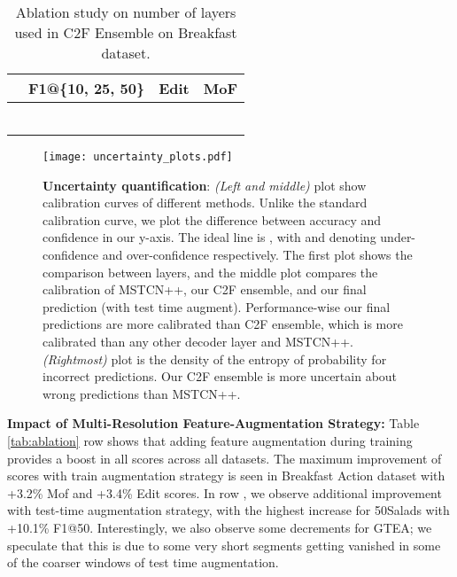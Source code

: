 \documentclass[10pt,twocolumn,letterpaper]{article}
\begin{document}
\begin{table}[]
    \centering
    \begin{tabular}{|p{3.3cm}|p{0.5cm}p{0.5cm}p{0.5cm}p{0.5cm}p{0.6cm}|}
    \hline
          & \multicolumn{3}{c}{F1@\{10, 25, 50\}} & Edit & MoF \\
         \hline\hline
          &  &  &  &  & \\\hline
          &  &  &  &  & \\\hline
          &  &  &  &  & \\\hline
          &  &  &  &  & \\\hline
          &  &  &  &  & \\\hline
          &  &  &  &  &  \\\hline
    \end{tabular}
    \caption{Ablation study on number of layers used in C2F Ensemble on Breakfast dataset.}
    \label{tab:weights_experiment}
\end{table}


\begin{figure*}
\begin{center}
\texttt{[image: uncertainty\_plots.pdf]}
\end{center}
\caption{\textbf{Uncertainty quantification}: \textit{(Left and middle)} plot show calibration curves of different methods. Unlike the standard calibration curve, we plot the difference between accuracy and confidence in our y-axis. The ideal line is , with  and  denoting under-confidence and over-confidence respectively. The first plot shows the comparison between layers, and the middle plot compares the calibration of MSTCN++, our C2F ensemble, and our final prediction (with test time augment). Performance-wise our final predictions are more calibrated than C2F ensemble, which is more calibrated than any other decoder layer and MSTCN++. \textit{(Rightmost)} plot is the density of the entropy of probability for incorrect predictions. Our C2F ensemble is more uncertain about wrong predictions than MSTCN++.}
\label{fig:uncertainty}
\end{figure*}

\textbf{Impact of Multi-Resolution Feature-Augmentation Strategy:} Table \ref{tab:ablation} row  shows that adding feature augmentation during training provides a boost in all scores across all datasets.
The maximum improvement of scores with train augmentation strategy is seen in Breakfast Action dataset with +3.2\% Mof and +3.4\% Edit scores. In row , we observe additional improvement with test-time augmentation strategy, with the highest increase for 50Salads with +10.1\% F1@50. Interestingly, we also observe some decrements for GTEA; we speculate that this is due to some very short segments getting vanished in some of the coarser windows of test time augmentation. 
\end{document}
